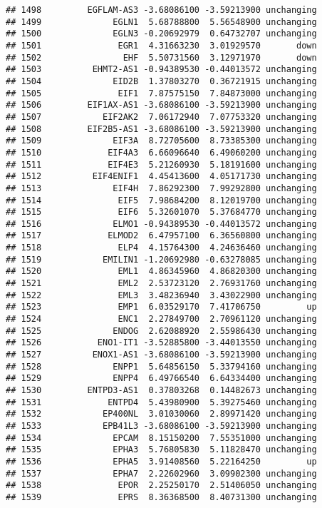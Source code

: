 \documentclass[]{article}
\begin{document}
\begin{verbatim}
## 1498         EGFLAM-AS3 -3.68086100 -3.59213900 unchanging
## 1499              EGLN1  5.68788800  5.56548900 unchanging
## 1500              EGLN3 -0.20692979  0.64732707 unchanging
## 1501               EGR1  4.31663230  3.01929570       down
## 1502                EHF  5.50731560  3.12971970       down
## 1503          EHMT2-AS1 -0.94389530 -0.44013572 unchanging
## 1504              EID2B  1.37803270  0.36721915 unchanging
## 1505               EIF1  7.87575150  7.84873000 unchanging
## 1506         EIF1AX-AS1 -3.68086100 -3.59213900 unchanging
## 1507            EIF2AK2  7.06172940  7.07753320 unchanging
## 1508         EIF2B5-AS1 -3.68086100 -3.59213900 unchanging
## 1509              EIF3A  8.72705600  8.73385300 unchanging
## 1510             EIF4A3  6.66096640  6.49060200 unchanging
## 1511             EIF4E3  5.21260930  5.18191600 unchanging
## 1512          EIF4ENIF1  4.45413600  4.05171730 unchanging
## 1513              EIF4H  7.86292300  7.99292800 unchanging
## 1514               EIF5  7.98684200  8.12019700 unchanging
## 1515               EIF6  5.32601070  5.37684770 unchanging
## 1516              ELMO1 -0.94389530 -0.44013572 unchanging
## 1517             ELMOD2  6.47957100  6.36560800 unchanging
## 1518               ELP4  4.15764300  4.24636460 unchanging
## 1519            EMILIN1 -1.20692980 -0.63278085 unchanging
## 1520               EML1  4.86345960  4.86820300 unchanging
## 1521               EML2  2.53723120  2.76931760 unchanging
## 1522               EML3  3.48236940  3.43022900 unchanging
## 1523               EMP1  6.03529170  7.41706750         up
## 1524               ENC1  2.27849700  2.70961120 unchanging
## 1525              ENDOG  2.62088920  2.55986430 unchanging
## 1526           ENO1-IT1 -3.52885800 -3.44013550 unchanging
## 1527          ENOX1-AS1 -3.68086100 -3.59213900 unchanging
## 1528              ENPP1  5.64856150  5.33794160 unchanging
## 1529              ENPP4  6.49766540  6.64334400 unchanging
## 1530         ENTPD3-AS1  0.37803268  0.14482673 unchanging
## 1531             ENTPD4  5.43980900  5.39275460 unchanging
## 1532            EP400NL  3.01030060  2.89971420 unchanging
## 1533            EPB41L3 -3.68086100 -3.59213900 unchanging
## 1534              EPCAM  8.15150200  7.55351000 unchanging
## 1535              EPHA3  5.76805830  5.11828470 unchanging
## 1536              EPHA5  3.91408560  5.22164250         up
## 1537              EPHA7  2.22602960  3.09902300 unchanging
## 1538               EPOR  2.25250170  2.51406050 unchanging
## 1539               EPRS  8.36368500  8.40731300 unchanging

\end{verbatim}
\end{document}
